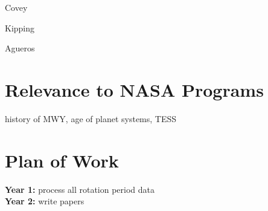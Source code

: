 \documentclass[12pt]{article}
\begin{document}
Covey

Kipping

Agueros

\section{Relevance to NASA Programs}
history of MWY, age of planet systems, TESS



\section{Plan of Work}
{\bf Year 1:} process all rotation period data
\\
{\bf Year 2:} write papers



\clearpage


\end{document}
